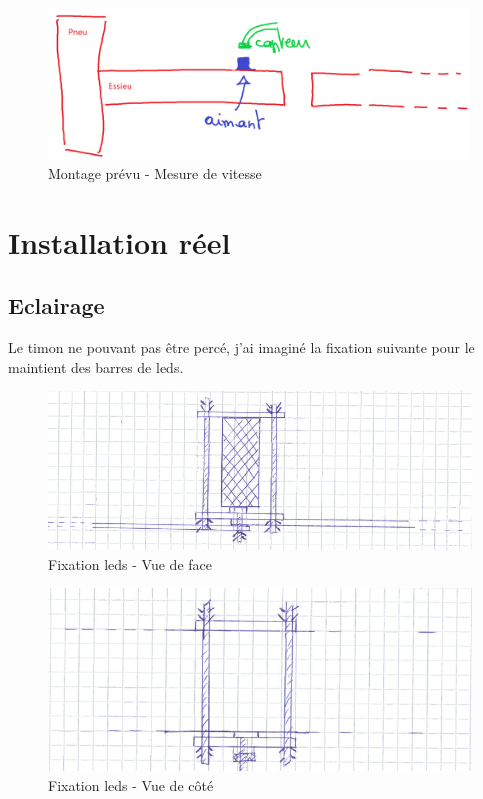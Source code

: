 \begin{figure}[H]
    \centering
    \includegraphics[height=4cm]{assets/figures/montage4.png}
    \caption{Montage prévu - Mesure de vitesse}
\end{figure}
\section{Installation réel}
\subsection{Eclairage}
Le timon ne pouvant pas être percé, j'ai imaginé la fixation suivante pour le maintient des barres de leds.

\begin{figure}[H]
    \centering
    \includegraphics[width=13cm]{assets/figures/fixation_eclairage_face.PNG}
    \caption{Fixation leds - Vue de face}
\end{figure}

\begin{figure}[H]
    \centering
    \includegraphics[width=13cm]{assets/figures/fixation_eclairage_cote.PNG}
    \caption{Fixation leds - Vue de côté}
\end{figure}

